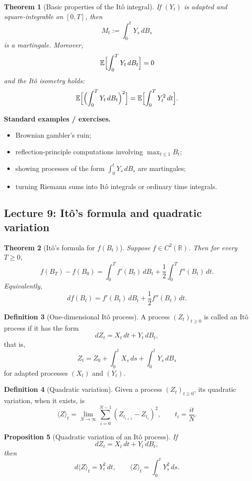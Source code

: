 \documentclass[11pt]{article}
\newtheorem{theorem}{Theorem}[section]
\newtheorem{proposition}[theorem]{Proposition}
\theoremstyle{definition}
\newtheorem{definition}[theorem]{Definition}
\begin{document}
\begin{theorem}[Basic properties of the It\^o integral]
If $(Y_t)$ is adapted and square-integrable on $[0,T]$, then
\[
M_t:=\int_0^t Y_s\,dB_s
\]
is a martingale. Moreover,
\[
\mathbb E\Bigl[\int_0^T Y_t\,dB_t\Bigr]=0
\]
and the It\^o isometry holds:
\[
\mathbb E\Bigl[\Bigl(\int_0^T Y_t\,dB_t\Bigr)^2\Bigr]
=
\mathbb E\Bigl[\int_0^T Y_t^2\,dt\Bigr].
\]
\end{theorem}

\textbf{Standard examples / exercises.}
\begin{itemize}[leftmargin=2em]
    \item Brownian gambler's ruin;
    \item reflection-principle computations involving $\max_{t\le 1} B_t$;
    \item showing processes of the form $\int_0^t Y_s\,dB_s$ are martingales;
    \item turning Riemann sums into It\^o integrals or ordinary time integrals.
\end{itemize}

\subsection{Lecture 9: It\^o's formula and quadratic variation}

\begin{theorem}[It\^o's formula for $f(B_t)$]
Suppose $f\in C^2(\mathbb R)$. Then for every $T\ge 0$,
\[
f(B_T)-f(B_0)
=
\int_0^T f'(B_t)\,dB_t
+
\frac12\int_0^T f''(B_t)\,dt.
\]
Equivalently,
\[
df(B_t)=f'(B_t)\,dB_t+\frac12 f''(B_t)\,dt.
\]
\end{theorem}

\begin{definition}[One-dimensional It\^o process]
A process $(Z_t)_{t\ge 0}$ is called an It\^o process if it has the form
\[
dZ_t = X_t\,dt + Y_t\,dB_t,
\]
that is,
\[
Z_t = Z_0 + \int_0^t X_s\,ds + \int_0^t Y_s\,dB_s
\]
for adapted processes $(X_t)$ and $(Y_t)$.
\end{definition}

\begin{definition}[Quadratic variation]
Given a process $(Z_t)_{t\ge 0}$, its quadratic variation, when it exists, is
\[
\langle Z\rangle_t
=
\lim_{N\to\infty}
\sum_{i=0}^{N-1}(Z_{t_{i+1}}-Z_{t_i})^2,
\qquad t_i=\frac{it}{N}.
\]
\end{definition}

\begin{proposition}[Quadratic variation of an It\^o process]
If
\[
dZ_t=X_t\,dt+Y_t\,dB_t,
\]
then
\[
d\langle Z\rangle_t = Y_t^2\,dt,
\qquad
\langle Z\rangle_t = \int_0^t Y_s^2\,ds.
\]
\end{proposition}
\end{document}
